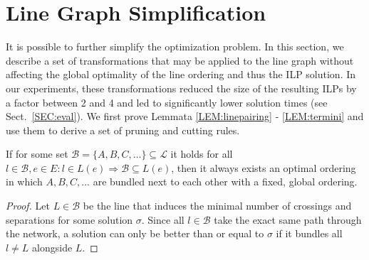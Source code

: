 \documentclass[format=acmsmall, review=false, screen=true]{acmart}
\begin{document}
\section{Line Graph Simplification}\label{SEC:coreprobgraph}
%
It is possible to further simplify the optimization problem. In this section, we describe a set of transformations that may be applied to the line graph without affecting the global optimality of the line ordering and thus the ILP solution.
In our experiments, these transformations reduced the size of the resulting ILPs by a factor between 2 and 4 and led to significantly lower solution times (see Sect.~\ref{SEC:eval}).
We first prove Lemmata \ref{LEM:linepairing} - \ref{LEM:termini} and use them to derive a set of pruning and cutting rules.
\begin{lemma}\label{LEM:linepairing}
If for some set $\mathcal{B} = \{A, B, C, ...\} \subseteq \mathcal{L}$ it holds for all $l \in \mathcal{B}, e \in E: l \in L(e) \Rightarrow \mathcal{B} \subseteq L(e)$, then it always exists an optimal ordering in which $A, B, C, ...$ are bundled next to each other with a fixed, global ordering.
\end{lemma}
\begin{proof}
Let $L \in \mathcal{B}$ be the line that induces the minimal number of crossings and separations for some solution $\sigma$. Since all $l \in \mathcal{B}$ take the exact same path through the network, a solution can only be better than or equal to $\sigma$ if it bundles all $l \neq L$ alongside $L$.
\end{proof}
\end{document}
